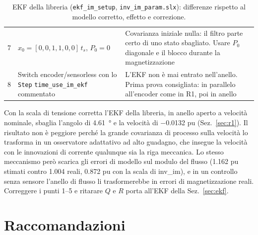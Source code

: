 \documentclass[10pt,a4paper]{scrartcl}
\newcommand{\code}[1]{\texttt{#1}}
\newcommand{\ts}{t_s}
\newcommand{\xh}{\hat{x}}
\begin{document}
\begin{onehalfspace}
\begin{table}[H]
\begin{tabular}{@{}R{0.6cm}R{6.6cm}R{8.3cm}@{}}
7 & $\xh_0 = [0,0,1,1,0,0]\,\ts$, $P_0 = 0$ & Covarianza iniziale nulla: il filtro parte certo di uno stato sbagliato. Usare $P_0$ diagonale e il blocco durante la magnetizzazione \\
8 & Switch encoder/sensorless con lo \code{Step} \code{time\_use\_im\_ekf} commentato & L'EKF non è mai entrato nell'anello. Prima prova consigliata: in parallelo all'encoder come in R1, poi in anello \\
\bottomrule
\end{tabular}
\caption{EKF della libreria (\code{ekf\_im\_setup}, \code{inv\_im\_param.slx}): differenze rispetto al modello corretto, effetto e correzione.}
\label{tab:libreria}
\end{table}

Con la scala di tensione corretta l'EKF della libreria, in anello aperto a velocità nominale, sbaglia l'angolo di \SI{4.61}{\degree} e la velocità di \num{-0.0132} pu (Sez.~\ref{sec:r1}). Il risultato non è peggiore perché la grande covarianza di processo sulla velocità lo trasforma in un osservatore adattativo ad alto guadagno, che insegue la velocità con le innovazioni di corrente qualunque sia la riga meccanica. Lo stesso meccanismo però scarica gli errori di modello sul modulo del flusso (\num{1.162} pu stimati contro \num{1.004} reali, \num{0.872} pu con la scala di inv\_im), e in un controllo senza sensore l'anello di flusso li trasformerebbe in errori di magnetizzazione reali. Correggere i punti 1--5 e ritarare $Q$ e $R$ porta all'EKF della Sez.~\ref{sec:ekf}.

\section{Raccomandazioni}
\label{sec:raccomandazioni}


\end{onehalfspace}
\end{document}
